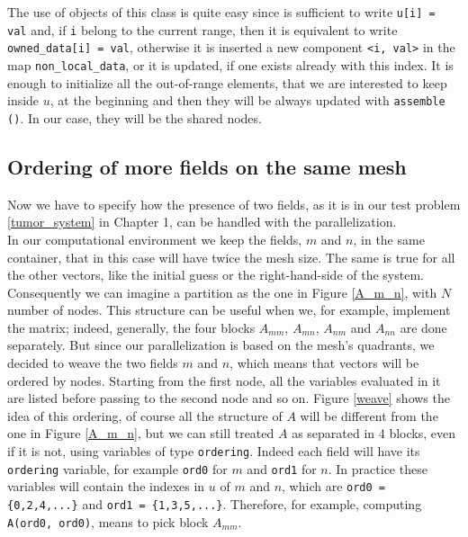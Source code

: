 The use of objects of this class is quite easy since is sufficient to write \texttt{u[i] = val} and, if  \texttt{i} belong to the current range, then it is equivalent to write \texttt{owned\_data[i] = val}, otherwise it is inserted a new component \texttt{<i, val>} in the map \texttt{non\_local\_data}, or it is updated, if one exists already with this index. It is enough to initialize all the out-of-range elements, that we are interested to keep inside $ u $, at the beginning and then they will be always updated with \texttt{assemble ()}. In our case, they will be the shared nodes.\\
\subsection{Ordering of more fields on the same mesh}
Now we have to specify how the presence of two fields, as it is in our test problem \eqref{tumor_system} in Chapter 1, can be handled with the parallelization. \\
In our computational environment we keep the fields, $ m $ and $ n $, in the same container, that in this case will have twice the mesh size. The same is true for all the other vectors, like the initial guess or the right-hand-side of the system.\\
Consequently we can imagine a partition as the one in Figure \ref{A_m_n}, with $ N $ number of nodes. This structure can be useful when we, for example, implement the matrix; indeed, generally, the four blocks $ A_{mm} $, $ A_{mn} $, $ A_{nm} $ and $ A_{nn} $ are done separately. But since our parallelization is based on the mesh's quadrants, we decided to weave the two fields $ m $ and $ n $, which means that vectors will be ordered by nodes. Starting from the first node, all the variables evaluated in it are listed before passing to the second node and so on. Figure \ref{weave} shows the idea of this ordering, of course all the structure of $ A $ will be different from the one in Figure \ref{A_m_n}, but we can still treated $ A $ as separated in 4 blocks, even if it is not, using variables of type \texttt{ordering}. Indeed each field will have its \texttt{ordering} variable, for example \texttt{ord0} for $ m $ and \texttt{ord1} for $ n $.  In practice these variables will contain the indexes in $ u $ of $ m $ and $ n $, which are \texttt{ord0 = \{0,2,4,...\}} and \texttt{ord1 = \{1,3,5,...\}}. Therefore, for example, computing \texttt{A(ord0, ord0)}, means to pick block $ A_{mm} $.

